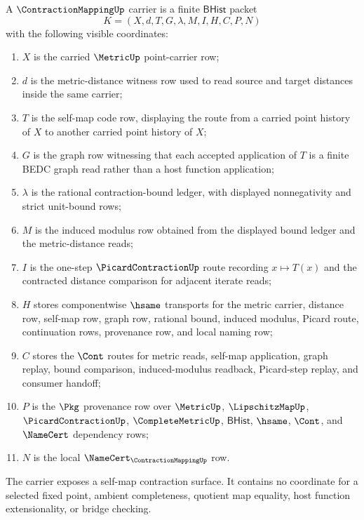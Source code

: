 \begin{definition}
\label{def:contraction-mapping-carrier}
A $\ContractionMappingUp$ carrier is a finite $\mathsf{BHist}$ packet
$$
K=(X,d,T,G,\lambda,M,I,H,C,P,N)
$$
with the following visible coordinates:
\begin{enumerate}
\item $X$ is the carried $\MetricUp$ point-carrier row;
\item $d$ is the metric-distance witness row used to read source and target distances inside the same carrier;
\item $T$ is the self-map code row, displaying the route from a carried point history of $X$ to another carried point history of $X$;
\item $G$ is the graph row witnessing that each accepted application of $T$ is a finite BEDC graph read rather than a host function application;
\item $\lambda$ is the rational contraction-bound ledger, with displayed nonnegativity and strict unit-bound rows;
\item $M$ is the induced modulus row obtained from the displayed bound ledger and the metric-distance reads;
\item $I$ is the one-step $\PicardContractionUp$ route recording $x\mapsto T(x)$ and the contracted distance comparison for adjacent iterate reads;
\item $H$ stores componentwise $\hsame$ transports for the metric carrier, distance row, self-map row, graph row, rational bound, induced modulus, Picard route, continuation rows, provenance row, and local naming row;
\item $C$ stores the $\Cont$ routes for metric reads, self-map application, graph replay, bound comparison, induced-modulus readback, Picard-step replay, and consumer handoff;
\item $P$ is the $\Pkg$ provenance row over $\MetricUp$, $\LipschitzMapUp$, $\PicardContractionUp$, $\CompleteMetricUp$, $\mathsf{BHist}$, $\hsame$, $\Cont$, and $\NameCert$ dependency rows;
\item $N$ is the local $\NameCert_{\ContractionMappingUp}$ row.
\end{enumerate}
The carrier exposes a self-map contraction surface. It contains no coordinate for a selected fixed point, ambient completeness, quotient map equality, host function extensionality, or bridge checking.
\end{definition}

